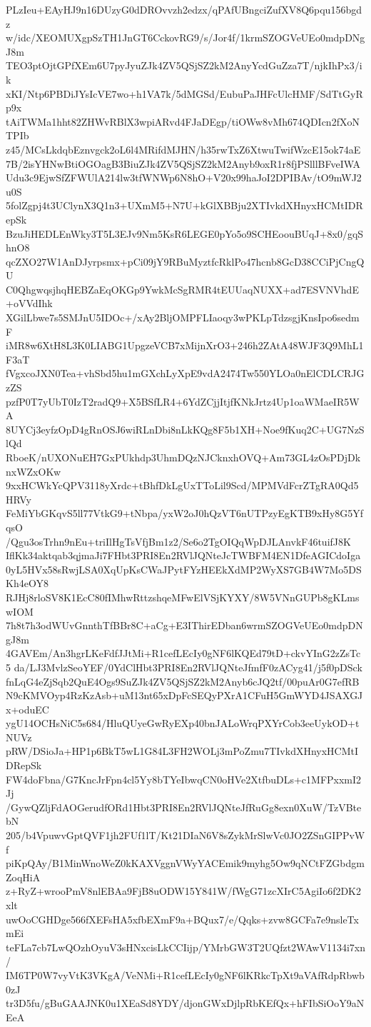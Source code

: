 PLzIeu+EAyHJ9n16DUzyG0dDROvvzh2edzx/qPAfUBngciZufXV8Q6pqu156bgdz
w/idc/XEOMUXgpSzTH1JnGT6CckovRG9/s/Jor4f/1krmSZOGVeUEo0mdpDNgJ8m
TEO3ptOjtGPfXEm6U7pyJyuZJk4ZV5QSjSZ2kM2AnyYcdGuZza7T/njkIhPx3/ik
xKI/Ntp6PBDiJYsIcVE7wo+h1VA7k/5dMGSd/EubuPaJHFcUlcHMF/SdTtGyRp9x
tAiTWMa1hht82ZHWvRBlX3wpiARvd4FJaDEgp/tiOWw8vMh674QDIcn2fXoNTPIb
z45/MCsLkdqbEznvgck2oL6l4MRifdMJHN/h35rwTxZ6XtwuTwifWzcE15ok74aE
7B/2isYHNwBtiOGOagB3BiuZJk4ZV5QSjSZ2kM2Anyb9oxR1r8fjPSlllBFveIWA
Udu3c9EjwSfZFWUlA214lw3tfWNWp6N8hO+V20x99haJoI2DPIBAv/tO9mWJ2u0S
5folZgpj4t3UClynX3Q1n3+UXmM5+N7U+kGlXBBju2XTIvkdXHnyxHCMtIDRepSk
BzuJiHEDLEnWky3T5L3EJv9Nm5KsR6LEGE0pYo5o9SCHEoouBUqJ+8x0/gqShnO8
qcZXO27W1AnDJyrpsmx+pCi09jY9RBuMyztfcRklPo47hcnb8GcD38CCiPjCngQU
C0QhgwqsjhqHEBZaEqOKGp9YwkMcSgRMR4tEUUaqNUXX+ad7ESVNVhdE+oVVdIhk
XGilLbwe7s5SMJnU5IDOc+/xAy2BljOMPFLIaoqy3wPKLpTdzsgjKnsIpo6sedmF
iMR8w6XtH8L3K0LIABG1UpgzeVCB7xMijnXrO3+246h2ZAtA48WJF3Q9MhL1F3aT
fVgxcoJXN0Tea+vhSbd5hu1mGXchLyXpE9vdA2474Tw550YLOa0nElCDLCRJGzZS
pzfP0T7yUbT0IzT2radQ9+X5BSfLR4+6YdZCjjItjfKNkJrtz4Up1oaWMaeIR5WA
8UYCj3eyfzOpD4gRnOSJ6wiRLnDbi8nLkKQg8F5b1XH+Noe9fKuq2C+UG7NzSlQd
RboeK/nUXONuEH7GxPUkhdp3UhmDQzNJCknxhOVQ+Am73GL4zOsPDjDknxWZxOKw
9xxHCWkYcQPV3118yXrdc+tBhfDkLgUxTToLil9Scd/MPMVdFcrZTgRA0Qd5HRVy
FeMiYbGKqvS5ll77VtkG9+tNbpa/yxW2oJ0hQzVT6nUTPzyEgKTB9xHy8G5YfqsO
/Qgu3osTrhn9nEu+triIlHgTsVfjBm1z2/Se6o2TgOIQqWpDJLAnvkF46tuifJ8K
IflKk34aktqab3qjmaJi7FHbt3PRI8En2RVlJQNteJcTWBFM4EN1DfeAGICdoIga
0yL5HVx58sRwjLSA0XqUpKsCWaJPytFYzHEEkXdMP2WyXS7GB4W7Mo5DSKh4eOY8
RJHj8rloSV8K1EcC80fIMhwRttzshqeMFwElVSjKYXY/8W5VNnGUPb8gKLmswIOM
7h8t7h3odWUvGnnthTfBBr8C+aCg+E3IThirEDban6wrmSZOGVeUEo0mdpDNgJ8m
4GAVEm/An3hgrLKeFdfJJtMi+R1cefLEcIy0gNF6lKQEd79tD+ckvYInG2zZsTc5
da/LJ3MvlzSeoYEF/0YdClHbt3PRI8En2RVlJQNteJfmfF0zACyg41/j5f0pDSck
fnLqG4eZjSqb2QuE4Ogs9SuZJk4ZV5QSjSZ2kM2Anyb6cJQ2tf/00puAr0G7efRB
N9cKMVOyp4RzKzAsb+uM13nt65xDpFcSEQyPXrA1CFuH5GmWYD4JSAXGJx+oduEC
ygU14OCHsNiC5s684/HluQUyeGwRyEXp40bnJALoWrqPXYrCob3eeUykOD+tNUVz
pRW/DSioJa+HP1p6BkT5wL1G84L3FH2WOLj3mPoZmu7TIvkdXHnyxHCMtIDRepSk
FW4doFbna/G7KncJrFpn4cl5Yy8bTYeIbwqCN0oHVe2XtfbuDLs+c1MFPxxmI2Jj
/GywQZljFdAOGerudfORd1Hbt3PRI8En2RVlJQNteJfRuGg8exn0XuW/TzVBtebN
205/b4VpuwvGptQVF1jh2FUf1lT/Kt21DIaN6V8sZykMrSlwVc0JO2ZSnGIPPvWf
piKpQAy/B1MinWnoWeZ0kKAXVggnVWyYACEmik9myhg5Ow9qNCtFZGbdgmZoqHiA
z+RyZ+wrooPmV8nlEBAa9FjB8uODW15Y841W/fWgG71zcXIrC5AgiIo6f2DK2xlt
uwOoCGHDge566fXEFsHA5xfbEXmF9a+BQux7/e/Qqks+zvw8GCFa7e9nsleTxmEi
teFLa7cb7LwQOzhOyuV3sHNxcisLkCCIijp/YMrbGW3T2UQfzt2WAwV1134i7xn/
IM6TP0W7vyVtK3VKgA/VeNMi+R1cefLEcIy0gNF6lKRkcTpXt9aVAfRdpRbwb0zJ
tr3D5fu/gBuGAAJNK0u1XEaSd8YDY/djonGWxDjlpRbKEfQx+hFIbSiOoY9aNEeA
